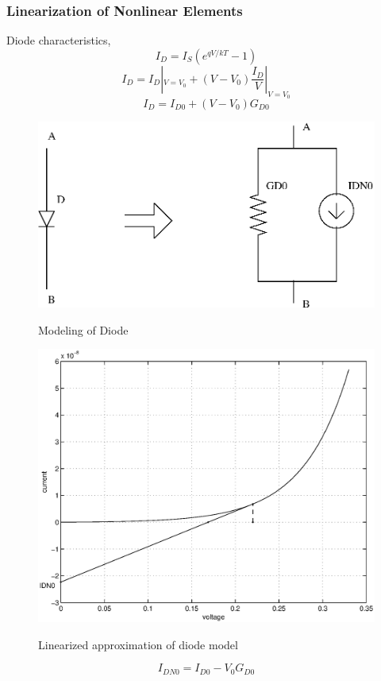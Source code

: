 \documentclass{beamer}
\begin{document}
\begin{frame}
\frametitle{Linearization of Nonlinear Elements}
\begin{minipage}[!b]{0.5\linewidth}
Diode characteristics,
$$I_D=I_S(e^{qV/kT}-1)$$
$$I_D=I_D|_{V=V_0} + (V-V_0)\frac{I_D}{V}|_{V=V_0}$$
$$I_D=I_{D0}+(V-V_0)G_{D0}$$
\begin{figure}[h]
\begin{center}
\includegraphics[scale=0.4]{../figures/diodeI.eps}
\begin{small}Modeling of Diode\end{small}
\label{diodeI}
\end{center}
\end{figure}
\end{minipage}
\begin{minipage}[!b]{0.4\linewidth}
\begin{figure}[h]
\begin{center}
\includegraphics[scale=0.3]{../figures/diodechar1.eps}
\begin{small}Linearized approximation of diode model\end{small}
\begin{tiny}$$I_{DN0}=I_{D0}-V_0G_{D0}$$\end{tiny}
\end{center}
\end{figure}
\end{minipage}
\end{frame}
\end{document}
